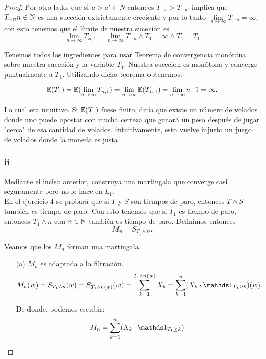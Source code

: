 \begin{proof}
			Por otro lado, que si $a>a' \in N$ entonces $T_{-a} > T_{-a'}$ implica que $T_{-n} n \in \mathbb{N}$ es 
			una suceción extrictamente creciente y por lo tanto 
			$\lim\limits_{n \rightarrow \infty} T_{-n} = \infty$, con esto tenemos que el límite de nuestra 
			suceción es 
			$$		
			\lim_{n\rightarrow\infty} T_{n,1} = 
			\lim_{n\rightarrow\infty} T_{-n} \wedge T_1 = 
			\infty \wedge T_1 = 
			T_1
			$$

			Tenemos todos los ingredientes para usar Teorema de convergencia monótona sobre nuestra suceción
			y la variable $T_1$. Nuestra sucecion es monótona y converge puntualmente a $T_1$. Utilizando
			dicho teorema obtenemos:
			
			$$
			\mathbb{E}(T_1) = 
			\mathbb{E}(\lim_{n\rightarrow\infty} T_{n,1}) = 
			\lim_{n\rightarrow\infty} \mathbb{E}(T_{n,1}) = 
			\lim_{n\rightarrow\infty} n\cdot 1 =
			\infty.
			$$
			
			Lo cual era intuitivo. Si $\mathbb{E}(T_1)$ fuese finito, diría que existe un número de volados donde
			uno puede apostar con mucha certeza que ganará un peso después de jugar "cerca" de esa cantidad
			de volados. Intuitivamente, esto vuelve injusto un juego de volados donde la moneda es
			justa.\\
			
		\subsubsection{ii}
		Mediante el inciso anterior, construya una martingala que converge 
		casi seguramente pero no lo hace en $L_1$.\\

			
			En el ejercicio 4 se probará que si $T$ y $S$ son tiempos de paro, entonces $T\wedge S$ también 
			es tiempo de paro. Con esto tenemos que si $T_1$ es tiempo de paro, entonces $T_1 \wedge n$ con 
			$n \in \mathbb{N}$ también es tiempo de paro. Definimos entonces 
			$$M_n = S_{T_1 \wedge n}.$$
			
			Veamos que los $M_n$ forman una martingala.
			
			\begin{itemize}
			 	\item[(a)] 
				 	$M_n$ es adaptada a la filtración.
			 		$$
			 		M_n(w) = S_{T_1 \wedge n}(w) = 
			 		S_{T_1 \wedge n (w)}(w) = 
			 		\sum_{k=1}^{T_1 \wedge n (w)} X_k = 
			 		\sum_{k=1}^{n} (X_k \cdot \indic_{T_1 \geq k})(w).
			 		$$
			 		
			 		De donde, podemos escribir:
					\begin{equation}\label{problema1_3:descomposicion_de_M_n}
			 			M_n = \sum_{k=1}^{n} (X_k \cdot \indic_{T_1 \geq k}).
					\end{equation}								 		
			 		

\end{itemize}
\end{proof}
